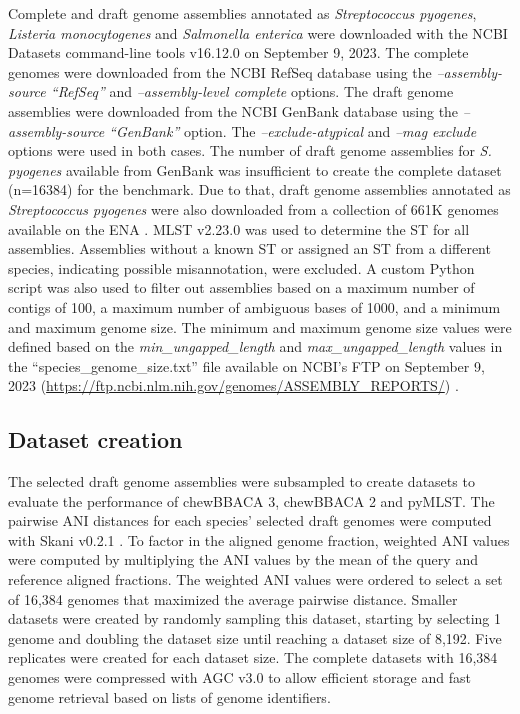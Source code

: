 Complete and draft genome assemblies annotated as \textit{Streptococcus pyogenes}, \textit{Listeria monocytogenes} and \textit{Salmonella enterica} were downloaded with the \ac{NCBI} Datasets command-line tools v16.12.0 \citep{oleary_exploring_2024} on September 9, 2023. The complete genomes were downloaded from the \ac{NCBI} RefSeq database \citep{sayers_database_2022} using the \textit{–assembly-source “RefSeq”} and \textit{–assembly-level complete} options. The draft genome assemblies were downloaded from the \ac{NCBI} GenBank database \citep{sayers_database_2022} using the \textit{–assembly-source “GenBank”} option. The \textit{–exclude-atypical} and \textit{–mag exclude} options were used in both cases. The number of draft genome assemblies for \textit{S. pyogenes} available from GenBank was insufficient to create the complete dataset (n=16384) for the benchmark. Due to that, draft genome assemblies annotated as \textit{Streptococcus pyogenes} were also downloaded from a collection of 661K genomes available on the \ac{ENA} \citep{blackwell_exploring_2021}. MLST v2.23.0 \citep{jolley_bigsdb_2010, seemann_mlst_nodate} was used to determine the \ac{ST} for all assemblies. Assemblies without a known \ac{ST} or assigned an \ac{ST} from a different species, indicating possible misannotation, were excluded. A custom Python script was also used to filter out assemblies based on a maximum number of contigs of 100, a maximum number of ambiguous bases of 1000, and a minimum and maximum genome size. The minimum and maximum genome size values were defined based on the \textit{min\_ungapped\_length} and \textit{max\_ungapped\_length} values in the “species\_genome\_size.txt” file available on \ac{NCBI}’s FTP on September 9, 2023 (\url{https://ftp.ncbi.nlm.nih.gov/genomes/ASSEMBLY_REPORTS/}) \citep{sayers_database_2022}.

\subsection{Dataset creation} \label{ssec:methods_ssec2}

The selected draft genome assemblies were subsampled to create datasets to evaluate the performance of chewBBACA 3, chewBBACA 2 and pyMLST. The pairwise \ac{ANI} distances for each species’ selected draft genomes were computed with Skani v0.2.1 \citep{shaw_fast_2023}. To factor in the aligned genome fraction, weighted \ac{ANI} values were computed by multiplying the \ac{ANI} values by the mean of the query and reference aligned fractions. The weighted \ac{ANI} values were ordered to select a set of 16,384 genomes that maximized the average pairwise distance. Smaller datasets were created by randomly sampling this dataset, starting by selecting 1 genome and doubling the dataset size until reaching a dataset size of 8,192. Five replicates were created for each dataset size. The complete datasets with 16,384 genomes were compressed with AGC v3.0 \citep{deorowicz_agc_2023} to allow efficient storage and fast genome retrieval based on lists of genome identifiers.

